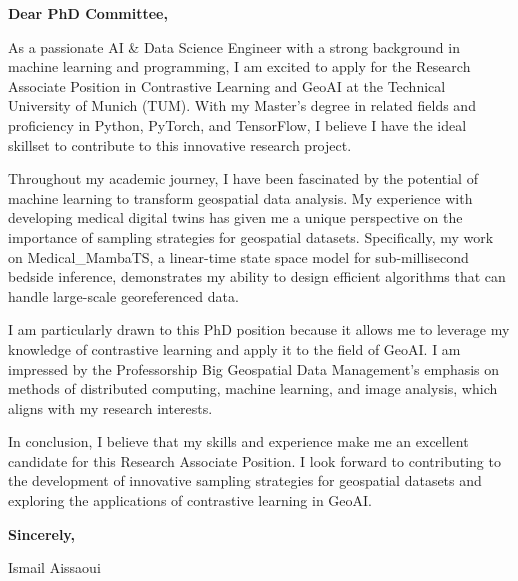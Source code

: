\documentclass{letter}
\date{August 1, 2026}
\begin{document}
\opening{\textbf{Dear PhD Committee,}}

As a passionate AI & Data Science Engineer with a strong background in machine learning and programming, I am excited to apply for the Research Associate Position in Contrastive Learning and GeoAI at the Technical University of Munich (TUM). With my Master's degree in related fields and proficiency in Python, PyTorch, and TensorFlow, I believe I have the ideal skillset to contribute to this innovative research project.

Throughout my academic journey, I have been fascinated by the potential of machine learning to transform geospatial data analysis. My experience with developing medical digital twins has given me a unique perspective on the importance of sampling strategies for geospatial datasets. Specifically, my work on Medical_MambaTS, a linear-time state space model for sub-millisecond bedside inference, demonstrates my ability to design efficient algorithms that can handle large-scale georeferenced data.

I am particularly drawn to this PhD position because it allows me to leverage my knowledge of contrastive learning and apply it to the field of GeoAI. I am impressed by the Professorship Big Geospatial Data Management's emphasis on methods of distributed computing, machine learning, and image analysis, which aligns with my research interests.

In conclusion, I believe that my skills and experience make me an excellent candidate for this Research Associate Position. I look forward to contributing to the development of innovative sampling strategies for geospatial datasets and exploring the applications of contrastive learning in GeoAI.

\closing{\textbf{Sincerely,}}

Ismail Aissaoui
\end{document}
